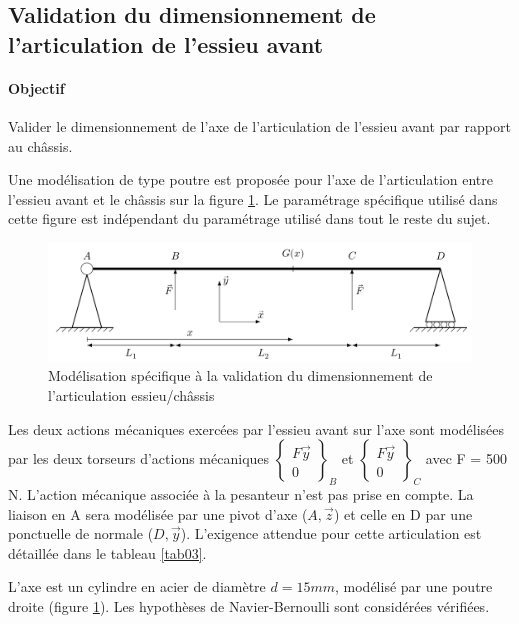 \subsection{Validation du dimensionnement de l'articulation de l'essieu avant}

\paragraph{Objectif} Valider le dimensionnement de l'axe de l'articulation de l'essieu avant par rapport au châssis.

Une modélisation de type poutre est proposée pour l'axe de l'articulation entre l'essieu avant et le châssis sur la figure \ref{fig09}. Le paramétrage spécifique utilisé dans cette figure est indépendant du paramétrage utilisé dans tout le reste du sujet.

\begin{figure}[!ht]
\begin{center}
 \includegraphics[width=0.7\linewidth]{img/fig09.png}
  \caption{Modélisation spécifique à la validation du dimensionnement de l'articulation essieu/châssis}
\label{fig09}
 \end{center}
\end{figure}

\vspace{-0.5cm}

Les deux actions mécaniques exercées par l'essieu avant sur l'axe sont modélisées par les deux torseurs d'actions mécaniques
$\left\{\begin{array}{c} F\vec{y}\\ 0 \end{array} \right\}_B$ et $\left\{\begin{array}{c} F\vec{y}\\ 0 \end{array} \right\}_C$ avec F = 500 N. L'action mécanique associée à la pesanteur n'est pas prise en compte. La liaison en A sera modélisée par une pivot d'axe ($A,\vec{z}$) et celle en D par une ponctuelle de normale ($D,\vec{y}$). L'exigence attendue pour cette articulation est détaillée dans le tableau \ref{tab03}.

L'axe est un cylindre en acier de diamètre $d = 15 mm$, modélisé par une poutre droite (figure \ref{fig09}). Les hypothèses de Navier-Bernoulli sont considérées vérifiées.

